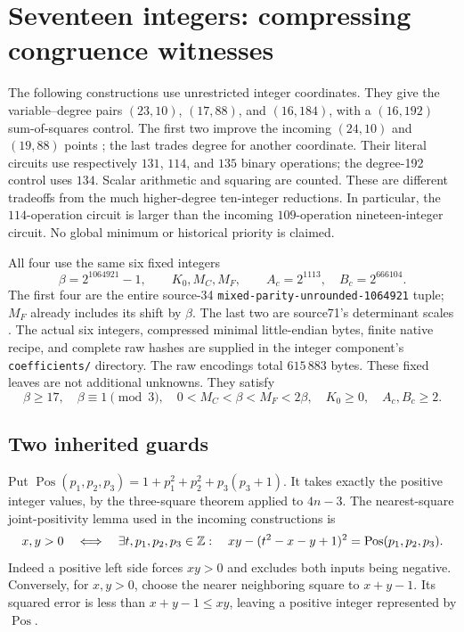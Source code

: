 \section{Seventeen integers: compressing congruence witnesses}
\label{sec:integer17}

The following constructions use unrestricted integer coordinates. They give
the variable--degree pairs $(23,10)$, $(17,88)$, and $(16,184)$,
with a $(16,192)$ sum-of-squares control.
The first two improve the incoming $(24,10)$ and $(19,88)$ points
\cite{budget,joint}; the last trades degree for another coordinate.
Their literal circuits use respectively $131$, $114$, and $135$ binary
operations; the degree-192 control uses $134$. Scalar arithmetic and
squaring are counted. These are different
tradeoffs from the much higher-degree ten-integer reductions. In particular,
the $114$-operation circuit is larger than the incoming $109$-operation
nineteen-integer circuit. No global minimum or historical priority is claimed.

All four use the same six fixed integers
\[
 \beta=2^{1064921}-1,\qquad K_0,M_C,M_F,\qquad
 A_c=2^{1113},\quad B_c=2^{666104}.
\]
The first four are the entire source-34
\texttt{mixed-parity-unrounded-1064921} tuple; $M_F$ already includes its
shift by $\beta$. The last two are source71's determinant scales
\cite{source71}. The actual six integers, compressed minimal little-endian
bytes, finite native recipe, and complete raw hashes are supplied in the
integer component's \texttt{coefficients/} directory. The raw encodings
total $615\,883$ bytes. These fixed leaves are not additional unknowns.
They satisfy
\[
 \beta\ge17,\quad\beta\equiv1\pmod3,\quad
 0<M_C<\beta<M_F<2\beta,\quad K_0\ge0,\quad A_c,B_c\ge2.
\]

\subsection{Two inherited guards}

Put $\operatorname{Pos}(p_1,p_2,p_3)=1+p_1^2+p_2^2+p_3(p_3+1)$.
It takes exactly the positive integer values, by the three-square theorem
applied to $4n-3$. The nearest-square joint-positivity lemma used in the
incoming constructions is
\begin{equation}\label{eq:integer-pair}
 x,y>0\quad\Longleftrightarrow\quad
 \exists t,p_1,p_2,p_3\in\mathbb Z:\quad
 xy-(t^2-x-y+1)^2=\operatorname{Pos}(p_1,p_2,p_3).
\end{equation}
Indeed a positive left side forces $xy>0$ and excludes both inputs being
negative. Conversely, for $x,y>0$, choose the nearer neighboring square
to $x+y-1$. Its squared error is less than $x+y-1\le xy$, leaving a
positive integer represented by $\operatorname{Pos}$.

